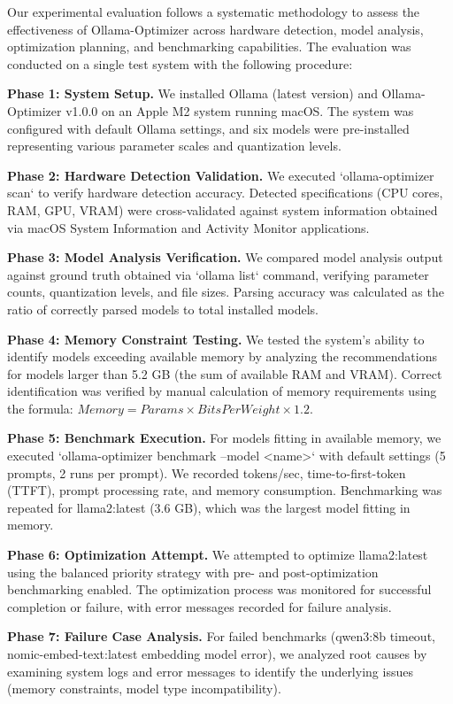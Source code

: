 \documentclass[journal]{IEEEtran}
\begin{document}
Our experimental evaluation follows a systematic methodology to assess the effectiveness of Ollama-Optimizer across hardware detection, model analysis, optimization planning, and benchmarking capabilities. The evaluation was conducted on a single test system with the following procedure:

\textbf{Phase 1: System Setup.} We installed Ollama (latest version) and Ollama-Optimizer v1.0.0 on an Apple M2 system running macOS. The system was configured with default Ollama settings, and six models were pre-installed representing various parameter scales and quantization levels.

\textbf{Phase 2: Hardware Detection Validation.} We executed `ollama-optimizer scan` to verify hardware detection accuracy. Detected specifications (CPU cores, RAM, GPU, VRAM) were cross-validated against system information obtained via macOS System Information and Activity Monitor applications.

\textbf{Phase 3: Model Analysis Verification.} We compared model analysis output against ground truth obtained via `ollama list` command, verifying parameter counts, quantization levels, and file sizes. Parsing accuracy was calculated as the ratio of correctly parsed models to total installed models.

\textbf{Phase 4: Memory Constraint Testing.} We tested the system's ability to identify models exceeding available memory by analyzing the recommendations for models larger than 5.2 GB (the sum of available RAM and VRAM). Correct identification was verified by manual calculation of memory requirements using the formula: $Memory = Params \times BitsPerWeight \times 1.2$.

\textbf{Phase 5: Benchmark Execution.} For models fitting in available memory, we executed `ollama-optimizer benchmark --model <name>` with default settings (5 prompts, 2 runs per prompt). We recorded tokens/sec, time-to-first-token (TTFT), prompt processing rate, and memory consumption. Benchmarking was repeated for llama2:latest (3.6 GB), which was the largest model fitting in memory.

\textbf{Phase 6: Optimization Attempt.} We attempted to optimize llama2:latest using the balanced priority strategy with pre- and post-optimization benchmarking enabled. The optimization process was monitored for successful completion or failure, with error messages recorded for failure analysis.

\textbf{Phase 7: Failure Case Analysis.} For failed benchmarks (qwen3:8b timeout, nomic-embed-text:latest embedding model error), we analyzed root causes by examining system logs and error messages to identify the underlying issues (memory constraints, model type incompatibility).
\end{document}
